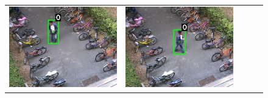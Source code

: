 
\begin{figure}[t]
  \centering
  \begin{tabular}{ccccc}
    \includegraphics[scale=0.24]{figures/case-1-suspicious-0187} &
    \includegraphics[scale=0.24]{figures/case-1-suspicious-0208} &

\end{tabular}
\end{figure}
